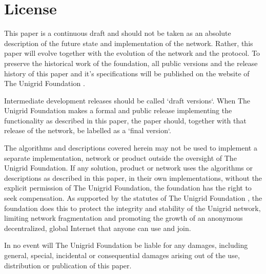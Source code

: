 \documentclass[10pt,a4paper,final]{article}
\begin{document}
\newpage
\section{License}
This paper is a continuous draft and should not be taken as an absolute description of the future state and implementation of the network. Rather, this paper will evolve together with the evolution of the network and the protocol. To preserve the historical work of the foundation, all public versions and the release history of this paper and it's specifications will be published on the website of The Unigrid Foundation \cite{unigrid}.

Intermediate development releases should be called `draft versions`. When The Unigrid Foundation makes a formal and public release implementing the functionality as described in this paper, the paper should, together with that release of the network, be labelled as a `final version`.

The algorithms and descriptions covered herein may not be used to implement a separate implementation, network or product outside the oversight of The Unigrid Foundation. If any solution, product or network uses the algorithms or descriptions as described in this paper, in their own implementations, without the explicit permission of The Unigrid Foundation, the foundation has the right to seek compensation. As supported by the statutes of The Unigrid Foundation \cite{unigridstatutes}, the foundation does this to protect the integrity and stability of the Unigrid network, limiting network fragmentation and promoting the growth of an anonymous decentralized, global Internet that anyone can use and join.

In no event will The Unigrid Foundation be liable for any damages, including general, special, incidental or consequential damages arising out of the use, distribution or publication of this paper.

\clearpage
\end{document}
